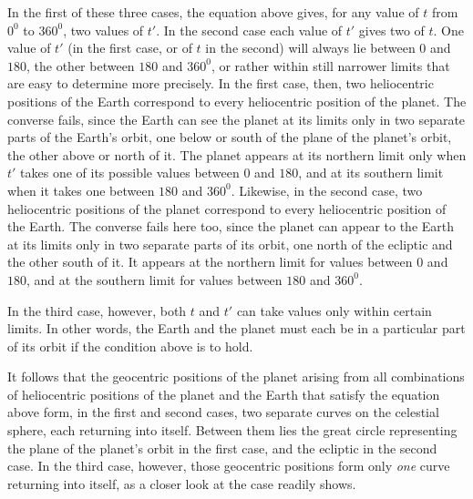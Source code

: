 In the first of these three cases, the equation above gives, for any
value of $t$ from $0^0$ to $360^0$, two values of $t'$. In the
second case each value of $t'$ gives two of $t$. One value of $t'$
(in the first case, or of $t$ in the second) will always lie between
$0$ and $180$, the other between $180$ and $360^0$, or rather within
still narrower limits that are easy to determine more precisely.
In the first case, then, two heliocentric positions of the Earth
correspond to every heliocentric position of the planet. The converse
fails, since the Earth can see the planet at its limits only in two
separate parts of the Earth’s orbit, one below or south of the plane
of the planet’s orbit, the other above or north of it. The planet
appears at its northern limit only when $t'$ takes one of its possible
values between $0$ and $180$, and at its southern limit when it takes
one between $180$ and $360^0$. Likewise, in the second case, two
heliocentric positions of the planet correspond to every heliocentric
position of the Earth. The converse fails here too, since the planet
can appear to the Earth at its limits only in two separate parts of
its orbit, one north of the ecliptic and the other south of it. It
appears at the northern limit for values between $0$ and $180$, and
at the southern limit for values between $180$ and $360^0$.

In the third case, however, both $t$ and $t'$ can take values only
within certain limits. In other words, the Earth and the planet
must each be in a particular part of its orbit if the condition
above is to hold.

It follows that the geocentric positions of the planet arising from
all combinations of heliocentric positions of the planet and the
Earth that satisfy the equation above form, in the first and second
cases, two separate curves on the celestial sphere, each returning
into itself. Between them lies the great circle representing the
plane of the planet’s orbit in the first case, and the ecliptic in the
second case.
%
In the third case, however, those geocentric positions form only
\textit{one} curve returning into itself, as a closer look at the
case readily shows.

